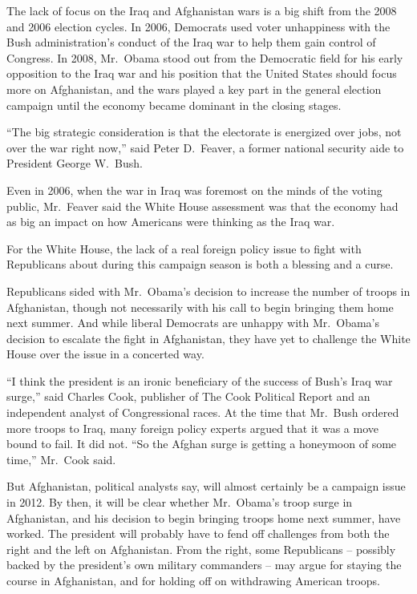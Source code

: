 ﻿\documentclass[12pt]{article}
\begin{document}
The lack of focus on the Iraq and Afghanistan wars is a big shift from the 2008 and 2006 election
cycles. In 2006, Democrats used voter unhappiness with the Bush administration's conduct of the Iraq
war to help them gain control of Congress. In 2008, Mr.~Obama stood out from the Democratic field
for his early opposition to the Iraq war and his position that the United States should focus more
on Afghanistan, and the wars played a key part in the general election campaign until the economy
became dominant in the closing stages.

``The big strategic consideration is that the electorate is energized over jobs, not over the war
right now,'' said Peter D.~Feaver, a former national security aide to President George W.~Bush.

Even in 2006, when the war in Iraq was foremost on the minds of the voting public, Mr.~Feaver said
the White House assessment was that the economy had as big an impact on how Americans were thinking
as the Iraq war.

For the White House, the lack of a real foreign policy issue to fight with Republicans about during
this campaign season is both a blessing and a curse.

Republicans sided with Mr.~Obama's decision to increase the number of troops in Afghanistan, though
not necessarily with his call to begin bringing them home next summer. And while liberal Democrats
are unhappy with Mr.~Obama's decision to escalate the fight in Afghanistan, they have yet to
challenge the White House over the issue in a concerted way.

``I think the president is an ironic beneficiary of the success of Bush's Iraq war surge,'' said
Charles Cook, publisher of The Cook Political Report and an independent analyst of Congressional
races. At the time that Mr.~Bush ordered more troops to Iraq, many foreign policy experts argued
that it was a move bound to fail. It did not. ``So the Afghan surge is getting a honeymoon of some
time,'' Mr.~Cook said.

But Afghanistan, political analysts say, will almost certainly be a campaign issue in 2012. By then,
it will be clear whether Mr.~Obama's troop surge in Afghanistan, and his decision to begin bringing
troops home next summer, have worked. The president will probably have to fend off challenges from
both the right and the left on Afghanistan. From the right, some Republicans -- possibly backed by
the president's own military commanders -- may argue for staying the course in Afghanistan, and for
holding off on withdrawing American troops.
\end{document}
